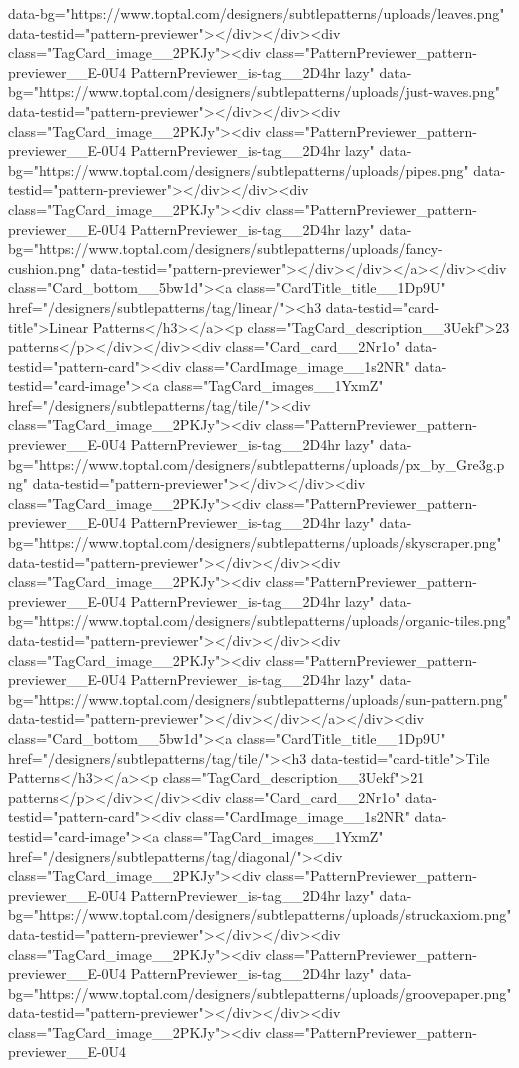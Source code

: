 data-bg="https://www.toptal.com/designers/subtlepatterns/uploads/leaves.png" data-testid="pattern-previewer"></div></div><div class="TagCard_image__2PKJy"><div class="PatternPreviewer_pattern-previewer__E-0U4 PatternPreviewer_is-tag__2D4hr lazy" data-bg="https://www.toptal.com/designers/subtlepatterns/uploads/just-waves.png" data-testid="pattern-previewer"></div></div><div class="TagCard_image__2PKJy"><div class="PatternPreviewer_pattern-previewer__E-0U4 PatternPreviewer_is-tag__2D4hr lazy" data-bg="https://www.toptal.com/designers/subtlepatterns/uploads/pipes.png" data-testid="pattern-previewer"></div></div><div class="TagCard_image__2PKJy"><div class="PatternPreviewer_pattern-previewer__E-0U4 PatternPreviewer_is-tag__2D4hr lazy" data-bg="https://www.toptal.com/designers/subtlepatterns/uploads/fancy-cushion.png" data-testid="pattern-previewer"></div></div></a></div><div class="Card_bottom__5bw1d"><a class="CardTitle_title__1Dp9U" href="/designers/subtlepatterns/tag/linear/"><h3 data-testid="card-title">Linear Patterns</h3></a><p class="TagCard_description__3Uekf">23 patterns</p></div></div><div class="Card_card__2Nr1o" data-testid="pattern-card"><div class="CardImage_image__1s2NR" data-testid="card-image"><a class="TagCard_images__1YxmZ" href="/designers/subtlepatterns/tag/tile/"><div class="TagCard_image__2PKJy"><div class="PatternPreviewer_pattern-previewer__E-0U4 PatternPreviewer_is-tag__2D4hr lazy" data-bg="https://www.toptal.com/designers/subtlepatterns/uploads/px_by_Gre3g.png" data-testid="pattern-previewer"></div></div><div class="TagCard_image__2PKJy"><div class="PatternPreviewer_pattern-previewer__E-0U4 PatternPreviewer_is-tag__2D4hr lazy" data-bg="https://www.toptal.com/designers/subtlepatterns/uploads/skyscraper.png" data-testid="pattern-previewer"></div></div><div class="TagCard_image__2PKJy"><div class="PatternPreviewer_pattern-previewer__E-0U4 PatternPreviewer_is-tag__2D4hr lazy" data-bg="https://www.toptal.com/designers/subtlepatterns/uploads/organic-tiles.png" data-testid="pattern-previewer"></div></div><div class="TagCard_image__2PKJy"><div class="PatternPreviewer_pattern-previewer__E-0U4 PatternPreviewer_is-tag__2D4hr lazy" data-bg="https://www.toptal.com/designers/subtlepatterns/uploads/sun-pattern.png" data-testid="pattern-previewer"></div></div></a></div><div class="Card_bottom__5bw1d"><a class="CardTitle_title__1Dp9U" href="/designers/subtlepatterns/tag/tile/"><h3 data-testid="card-title">Tile Patterns</h3></a><p class="TagCard_description__3Uekf">21 patterns</p></div></div><div class="Card_card__2Nr1o" data-testid="pattern-card"><div class="CardImage_image__1s2NR" data-testid="card-image"><a class="TagCard_images__1YxmZ" href="/designers/subtlepatterns/tag/diagonal/"><div class="TagCard_image__2PKJy"><div class="PatternPreviewer_pattern-previewer__E-0U4 PatternPreviewer_is-tag__2D4hr lazy" data-bg="https://www.toptal.com/designers/subtlepatterns/uploads/struckaxiom.png" data-testid="pattern-previewer"></div></div><div class="TagCard_image__2PKJy"><div class="PatternPreviewer_pattern-previewer__E-0U4 PatternPreviewer_is-tag__2D4hr lazy" data-bg="https://www.toptal.com/designers/subtlepatterns/uploads/groovepaper.png" data-testid="pattern-previewer"></div></div><div class="TagCard_image__2PKJy"><div class="PatternPreviewer_pattern-previewer__E-0U4 